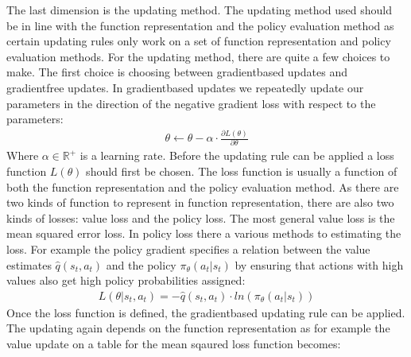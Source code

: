 \documentclass[letterpaper,10pt,english]{jupyterBook}
\begin{document}
\sphinxAtStartPar
The last dimension is the updating method. The updating method used should be in line with the function representation and the policy evaluation method as certain updating rules only work on a set of function representation and policy evaluation methods. For the updating method, there are quite a few choices to make. The first choice is choosing between gradient\sphinxhyphen{}based updates and gradient\sphinxhyphen{}free updates. In gradient\sphinxhyphen{}based updates we repeatedly update our parameters in the direction of the negative gradient loss with respect to the parameters:
\begin{equation*}
\begin{split} \theta \leftarrow \theta - \alpha \cdot \frac{\partial L(\theta)}{\partial \theta} \end{split}
\end{equation*}
\sphinxAtStartPar
Where \(\alpha \in \mathbb{R}^+\) is a learning rate. Before the updating rule can be applied a loss function \(L(\theta)\) should first be chosen. The loss function is usually a function of both the function representation and the policy evaluation method. As there are two kinds of function to represent in function representation, there are also two kinds of losses: value loss and the policy loss. The most general value loss is the mean squared error loss. In policy loss there a various methods to estimating the loss. For example the policy gradient specifies a relation between the value estimates \(\hat{q}(s_t,a_t)\) and the policy \(\pi_{\theta}(a_t|s_t)\) by ensuring that actions with high values also get high policy probabilities assigned:
\begin{equation*}
\begin{split}L(\theta|s_t, a_t) = -\hat{q}(s_t,a_t) \cdot ln (\pi_{\theta}(a_t|s_t))\end{split}
\end{equation*}
\sphinxAtStartPar
Once the loss function is defined, the gradient\sphinxhyphen{}based updating rule can be applied. The updating again depends on the function representation as for example the value update on a table for the mean sqaured loss function becomes:
\end{document}
